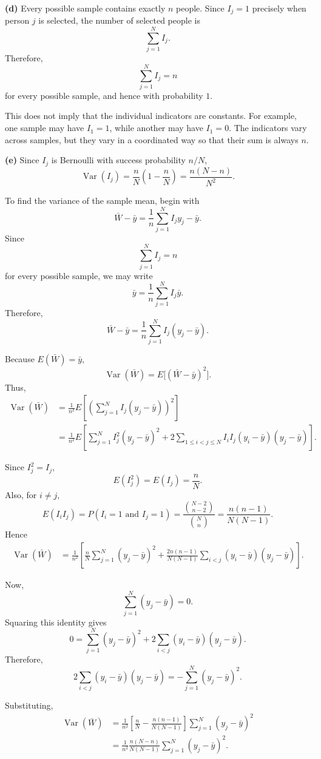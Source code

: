 \documentclass[11pt]{article}
\begin{document}
\begin{solutionbox}
\medskip

\textbf{(d)}
Every possible sample contains exactly \(n\) people. Since \(I_j=1\) precisely
when person \(j\) is selected, the number of selected people is
\[
\sum_{j=1}^N I_j.
\]
Therefore,
\[
\sum_{j=1}^N I_j=n
\]
for every possible sample, and hence with probability \(1\).

This does not imply that the individual indicators are constants. For example,
one sample may have \(I_1=1\), while another may have \(I_1=0\). The indicators
vary across samples, but they vary in a coordinated way so that their sum is
always \(n\).

\medskip
\textbf{(e)}
Since \(I_j\) is Bernoulli with success probability \(n/N\),
\[
\operatorname{Var}(I_j)
=
\frac{n}{N}\left(1-\frac{n}{N}\right)
=
\frac{n(N-n)}{N^2}.
\]

To find the variance of the sample mean, begin with
\[
\bar W-\bar y
=
\frac{1}{n}\sum_{j=1}^N I_jy_j-\bar y.
\]
Since
\[
\sum_{j=1}^N I_j=n
\]
for every possible sample, we may write
\[
\bar y
=
\frac{1}{n}\sum_{j=1}^N I_j\bar y.
\]
Therefore,
\[
\bar W-\bar y
=
\frac{1}{n}\sum_{j=1}^N I_j(y_j-\bar y).
\]

Because \(E(\bar W)=\bar y\),
\[
\operatorname{Var}(\bar W)
=
E\bigl[(\bar W-\bar y)^2\bigr].
\]
Thus,
\begin{align*}
\operatorname{Var}(\bar W)
&=
\frac{1}{n^2}
E\left[
\left(
\sum_{j=1}^N I_j(y_j-\bar y)
\right)^2
\right]\\
&=
\frac{1}{n^2}
E\left[
\sum_{j=1}^N I_j^2(y_j-\bar y)^2
+
2\sum_{1\leq i<j\leq N}
I_iI_j(y_i-\bar y)(y_j-\bar y)
\right].
\end{align*}

Since \(I_j^2=I_j\),
\[
E(I_j^2)=E(I_j)=\frac{n}{N}.
\]
Also, for \(i\neq j\),
\[
E(I_iI_j)
=
P(I_i=1 \text{ and } I_j=1)
=
\frac{\binom{N-2}{n-2}}{\binom{N}{n}}
=
\frac{n(n-1)}{N(N-1)}.
\]
Hence
\begin{align*}
\operatorname{Var}(\bar W)
&=
\frac{1}{n^2}
\left[
\frac{n}{N}
\sum_{j=1}^N (y_j-\bar y)^2
+
\frac{2n(n-1)}{N(N-1)}
\sum_{i<j}(y_i-\bar y)(y_j-\bar y)
\right].
\end{align*}

Now,
\[
\sum_{j=1}^N (y_j-\bar y)=0.
\]
Squaring this identity gives
\[
0
=
\sum_{j=1}^N (y_j-\bar y)^2
+
2\sum_{i<j}(y_i-\bar y)(y_j-\bar y).
\]
Therefore,
\[
2\sum_{i<j}(y_i-\bar y)(y_j-\bar y)
=
-\sum_{j=1}^N (y_j-\bar y)^2.
\]

Substituting,
\begin{align*}
\operatorname{Var}(\bar W)
&=
\frac{1}{n^2}
\left[
\frac{n}{N}
-
\frac{n(n-1)}{N(N-1)}
\right]
\sum_{j=1}^N (y_j-\bar y)^2\\
&=
\frac{1}{n^2}
\frac{n(N-n)}{N(N-1)}
\sum_{j=1}^N (y_j-\bar y)^2.
\end{align*}


\end{solutionbox}
\end{document}
